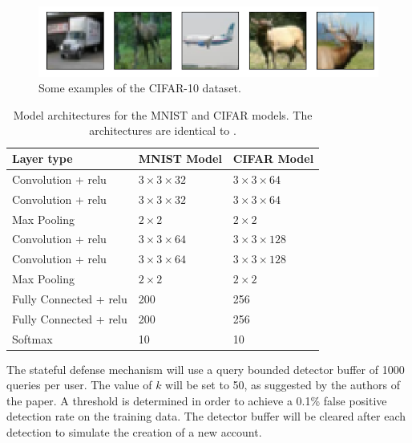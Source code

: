 \begin{figure}
\centering
\includegraphics[width=\textwidth]{Images/cifar.png}
\caption[Some examples of the CIFAR-10 dataset]{Some examples of the CIFAR-10 dataset.}
\label{fig:cifar}
\end{figure}

\begin{table}
	\centering
	\caption[Model architectures for the MNIST and CIFAR model]{Model architectures for the MNIST and CIFAR models. The architectures are identical to \cite{cw_attack, defensive_distillation}.}
    \begin{tabular}{lll}\toprule
        Layer type     & MNIST Model &CIFAR Model\\ \midrule
		Convolution + \gls{relu}	&$3 \times 3 \times 32$ &$3\times3\times64$\\
		Convolution + \gls{relu}	&$3 \times 3 \times 32$ &$3\times3\times64$\\
		Max Pooling					&$2 \times2$			&$2\times2$\\
		Convolution + \gls{relu}	&$3 \times 3 \times 64$ &$3\times3\times128$\\
		Convolution + \gls{relu}	&$3 \times 3 \times 64$ &$3\times3\times128$\\
		Max Pooling					&$2 \times2$			&$2\times2$\\
		Fully Connected + \gls{relu}&200					&256\\
		Fully Connected + \gls{relu}&200					&256\\
		Softmax						&10						&10\\
        \bottomrule
    \end{tabular}
    \label{tbl:architectures}
\end{table}

The stateful defense mechanism \cite{chen_stateful_2019} will use a query bounded detector buffer of 1000 queries per user. The value of $k$ will be set to 50, as suggested by the authors of the paper. A threshold is determined in order to achieve a 0.1\% false positive detection rate on the training data. The detector buffer will be cleared after each detection to simulate the creation of a new account.\\

